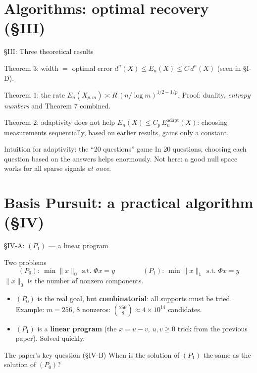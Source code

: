 \documentclass[aspectratio=169,11pt]{beamer}
\newcommand{\en}[1]{\textit{#1}}          %
\newcommand{\norm}[1]{\lVert #1\rVert}
\begin{document}
\section{Algorithms: optimal recovery (\S III)}

\begin{frame}{\S III: Three theoretical results}
  \begin{block}{Theorem 3: width $=$ optimal error}
    $d^n(X)\le E_n(X)\le C\,d^n(X)$ (seen in \S I-D).
  \end{block}
  \begin{block}{Theorem 1: the rate}
    $E_n(X_{p,m})\asymp R\,(n/\log m)^{1/2-1/p}$. Proof: duality, \en{entropy numbers} and Theorem 7 combined.
  \end{block}
  \begin{block}{Theorem 2: adaptivity does not help}
    $E_n(X)\le C_p\,E_n^{\text{adapt}}(X)$: choosing measurements sequentially, based on earlier results, gains only a constant.
  \end{block}
  \begin{exampleblock}{Intuition for adaptivity: the ``20 questions'' game}
    In 20 questions, choosing each question based on the answers helps enormously. Not here: a good null space works for all sparse signals \emph{at once}.
  \end{exampleblock}
\end{frame}

\section{Basis Pursuit: a practical algorithm (\S IV)}

\begin{frame}{\S IV-A: $(P_1)$ --- a linear program}
  \begin{block}{Two problems}
    \[
      (P_0):\ \min\norm{x}_0\ \ \text{s.t. }\Phi x=y \qquad\qquad (P_1):\ \min\norm{x}_1\ \ \text{s.t. }\Phi x=y
    \]
    $\norm{x}_0$ is the number of nonzero components.
  \end{block}
  \begin{itemize}
    \item $(P_0)$ is the real goal, but \textbf{combinatorial}: all supports must be tried.
          {\small Example: $m=256$, 8 nonzeros: $\binom{256}{8}\approx4\times10^{14}$ candidates.}
    \item $(P_1)$ is a \textbf{linear program} (the $x=u-v$, $u,v\ge0$ trick from the previous paper). Solved quickly.
  \end{itemize}
  \begin{alertblock}{The paper's key question (\S IV-B)}
    When is the solution of $(P_1)$ the same as the solution of $(P_0)$?
  \end{alertblock}
\end{frame}
\end{document}
